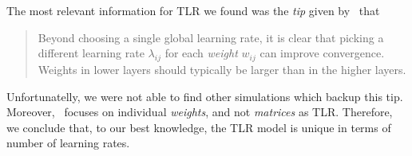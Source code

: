 The most relevant information for TLR we found was the \emph{tip} given by~\citet{lecun2012efficient} that \blockquote{Beyond choosing a single global learning rate, it is clear that picking a different learning rate $\lambda_{ij}$ for each \emph{weight} $w_{ij}$ can improve convergence. Weights in lower layers should typically be larger than in the higher layers.} Unfortunatelly, we were not able to find other simulations which backup this tip. Moreover,~\citet{lecun2012efficient} focuses on individual \emph{weights}, and not \emph{matrices} as TLR. Therefore, we conclude that, to our best knowledge, the TLR model is unique in terms of number of learning rates. 

